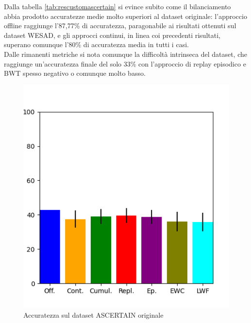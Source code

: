 Dalla tabella \ref{tab:rescustomascertain} si evince subito come il bilanciamento abbia prodotto accuratezze medie molto superiori al dataset originale: l'approccio offline raggiunge l'87,77\% di accuratezza, paragonabile ai risultati ottenuti sul dataset WESAD, e gli approcci continui, in linea coi precedenti risultati, superano comunque l'80\% di accuratezza media in tutti i casi.\\
Dalle rimanenti metriche si nota comunque la difficoltà intrinseca del dataset, che raggiunge un'accuratezza finale del solo 33\% con l'approccio di replay episodico e BWT spesso negativo o comunque molto basso.
\begin{figure}[!tbp]
    \begin{minipage}[b]{0.5\textwidth}
		\includegraphics[width=\textwidth]{img/graphs/ascertain_final_accuracy.png}
		\caption{Accuratezza sul dataset ASCERTAIN originale}
		\label{fig:ascertain_accuracy_graph}
	\end{minipage}
    \hfill
    \begin{minipage}[b]{0.5\textwidth}

\end{minipage}
\end{figure}

